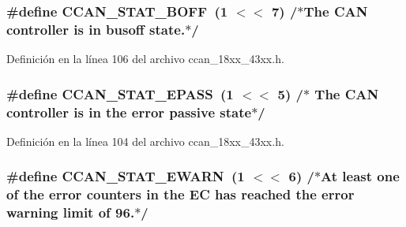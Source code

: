 \subsubsection[{\texorpdfstring{C\+C\+A\+N\+\_\+\+S\+T\+A\+T\+\_\+\+B\+O\+FF}{CCAN_STAT_BOFF}}]{\setlength{\rightskip}{0pt plus 5cm}\#define C\+C\+A\+N\+\_\+\+S\+T\+A\+T\+\_\+\+B\+O\+FF~(1 $<$$<$ 7)	/$\ast$The C\+AN controller is in busoff state.$\ast$/}\hypertarget{group___c_c_a_n__18_x_x__43_x_x_gaf5bda007aa17c3fe3f8a8417dd5feb1e}{}\label{group___c_c_a_n__18_x_x__43_x_x_gaf5bda007aa17c3fe3f8a8417dd5feb1e}


Definición en la línea 106 del archivo ccan\+\_\+18xx\+\_\+43xx.\+h.

\subsubsection[{\texorpdfstring{C\+C\+A\+N\+\_\+\+S\+T\+A\+T\+\_\+\+E\+P\+A\+SS}{CCAN_STAT_EPASS}}]{\setlength{\rightskip}{0pt plus 5cm}\#define C\+C\+A\+N\+\_\+\+S\+T\+A\+T\+\_\+\+E\+P\+A\+SS~(1 $<$$<$ 5)	/$\ast$ The C\+AN controller is in the {\bf error} passive state$\ast$/}\hypertarget{group___c_c_a_n__18_x_x__43_x_x_ga86acb18cb4751429d866c9fb8f119d44}{}\label{group___c_c_a_n__18_x_x__43_x_x_ga86acb18cb4751429d866c9fb8f119d44}


Definición en la línea 104 del archivo ccan\+\_\+18xx\+\_\+43xx.\+h.

\subsubsection[{\texorpdfstring{C\+C\+A\+N\+\_\+\+S\+T\+A\+T\+\_\+\+E\+W\+A\+RN}{CCAN_STAT_EWARN}}]{\setlength{\rightskip}{0pt plus 5cm}\#define C\+C\+A\+N\+\_\+\+S\+T\+A\+T\+\_\+\+E\+W\+A\+RN~(1 $<$$<$ 6)	/$\ast$At least one of the {\bf error} counters in the EC has reached the {\bf error} warning limit of 96.$\ast$/}\hypertarget{group___c_c_a_n__18_x_x__43_x_x_ga1775fca8e7a3c3c5b4572f4a60be573b}{}\label{group___c_c_a_n__18_x_x__43_x_x_ga1775fca8e7a3c3c5b4572f4a60be573b}


